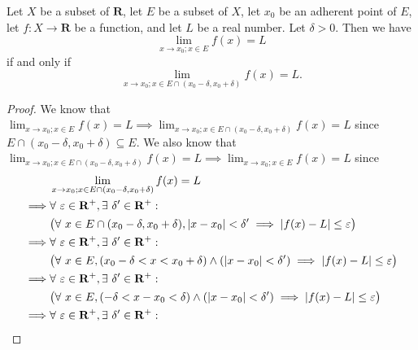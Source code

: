 \begin{proposition}\label{9.3.18}
    Let \(X\) be a subset of \(\mathbf{R}\), let \(E\) be a subset of \(X\), let \(x_0\) be an adherent point of \(E\), let \(f : X \to \mathbf{R}\) be a function, and let \(L\) be a real number.
    Let \(\delta > 0\).
    Then we have
    \[
        \lim_{x \to x_0 ; x \in E} f(x) = L
    \]
    if and only if
    \[
        \lim_{x \to x_0 ; x \in E \cap (x_0 - \delta, x_0 + \delta)} f(x) = L.
    \]
\end{proposition}

\begin{proof}
    We know that \(\lim_{x \to x_0 ; x \in E} f(x) = L \implies \lim_{x \to x_0 ; x \in E \cap (x_0 - \delta, x_0 + \delta)} f(x) = L\) since \(E \cap (x_0 - \delta, x_0 + \delta) \subseteq E\).
    We also know that \(\lim_{x \to x_0 ; x \in E \cap (x_0 - \delta, x_0 + \delta)} f(x) = L \implies \lim_{x \to x_0 ; x \in E} f(x) = L\) since
    \begin{align*}
                 & \lim_{x \to x_0 ; x \in E \cap (x_0 - \delta, x_0 + \delta)} f(x) = L                                                                    \\
        \implies & \forall\ \varepsilon \in \mathbf{R}^+, \exists\ \delta' \in \mathbf{R}^+ :                                                               \\
                 & \big(\forall\ x \in E \cap (x_0 - \delta, x_0 + \delta), \abs*{x - x_0} < \delta' \implies \abs*{f(x) - L} \leq \varepsilon\big)         \\
        \implies & \forall\ \varepsilon \in \mathbf{R}^+, \exists\ \delta' \in \mathbf{R}^+ :                                                               \\
                 & \big(\forall\ x \in E, (x_0 - \delta < x < x_0 + \delta) \land (\abs*{x - x_0} < \delta') \implies \abs*{f(x) - L} \leq \varepsilon\big) \\
        \implies & \forall\ \varepsilon \in \mathbf{R}^+, \exists\ \delta' \in \mathbf{R}^+ :                                                               \\
                 & \big(\forall\ x \in E, (-\delta < x - x_0 < \delta) \land (\abs*{x - x_0} < \delta') \implies \abs*{f(x) - L} \leq \varepsilon\big)      \\
        \implies & \forall\ \varepsilon \in \mathbf{R}^+, \exists\ \delta' \in \mathbf{R}^+ :                                                               \\

\end{align*}
\end{proof}

